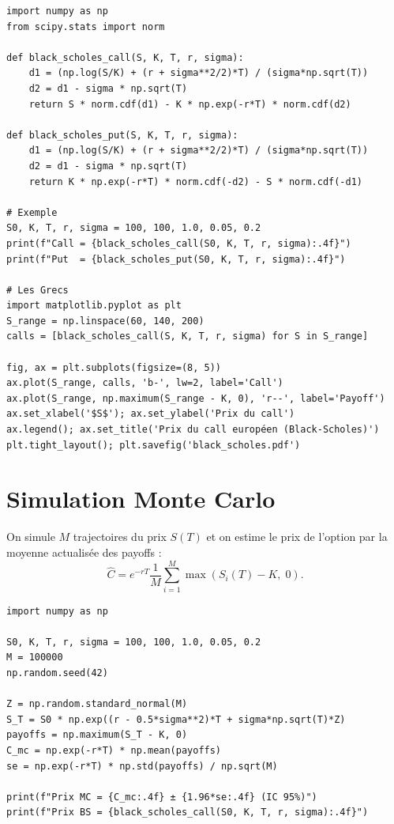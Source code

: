 \begin{codeblock}[title=\textbf{Formule de Black--Scholes en Python}]
\begin{verbatim}
import numpy as np
from scipy.stats import norm

def black_scholes_call(S, K, T, r, sigma):
    d1 = (np.log(S/K) + (r + sigma**2/2)*T) / (sigma*np.sqrt(T))
    d2 = d1 - sigma * np.sqrt(T)
    return S * norm.cdf(d1) - K * np.exp(-r*T) * norm.cdf(d2)

def black_scholes_put(S, K, T, r, sigma):
    d1 = (np.log(S/K) + (r + sigma**2/2)*T) / (sigma*np.sqrt(T))
    d2 = d1 - sigma * np.sqrt(T)
    return K * np.exp(-r*T) * norm.cdf(-d2) - S * norm.cdf(-d1)

# Exemple
S0, K, T, r, sigma = 100, 100, 1.0, 0.05, 0.2
print(f"Call = {black_scholes_call(S0, K, T, r, sigma):.4f}")
print(f"Put  = {black_scholes_put(S0, K, T, r, sigma):.4f}")

# Les Grecs
import matplotlib.pyplot as plt
S_range = np.linspace(60, 140, 200)
calls = [black_scholes_call(S, K, T, r, sigma) for S in S_range]

fig, ax = plt.subplots(figsize=(8, 5))
ax.plot(S_range, calls, 'b-', lw=2, label='Call')
ax.plot(S_range, np.maximum(S_range - K, 0), 'r--', label='Payoff')
ax.set_xlabel('$S$'); ax.set_ylabel('Prix du call')
ax.legend(); ax.set_title('Prix du call européen (Black-Scholes)')
plt.tight_layout(); plt.savefig('black_scholes.pdf')
\end{verbatim}
\end{codeblock}

\section{Simulation Monte Carlo}
\label{sec:monte_carlo}

\begin{definition}
On simule $M$ trajectoires du prix $S(T)$ et on estime le prix
de l'option par la moyenne actualis\'ee des payoffs :
\[
  \hat{C} = e^{-rT}\frac{1}{M}\sum_{i=1}^M \max(S_i(T)-K,\;0).
\]
\end{definition}

\begin{codeblock}[title=\textbf{Monte Carlo pour le call europ\'een}]
\begin{verbatim}
import numpy as np

S0, K, T, r, sigma = 100, 100, 1.0, 0.05, 0.2
M = 100000
np.random.seed(42)

Z = np.random.standard_normal(M)
S_T = S0 * np.exp((r - 0.5*sigma**2)*T + sigma*np.sqrt(T)*Z)
payoffs = np.maximum(S_T - K, 0)
C_mc = np.exp(-r*T) * np.mean(payoffs)
se = np.exp(-r*T) * np.std(payoffs) / np.sqrt(M)

print(f"Prix MC = {C_mc:.4f} ± {1.96*se:.4f} (IC 95%)")
print(f"Prix BS = {black_scholes_call(S0, K, T, r, sigma):.4f}")
\end{verbatim}
\end{codeblock}

